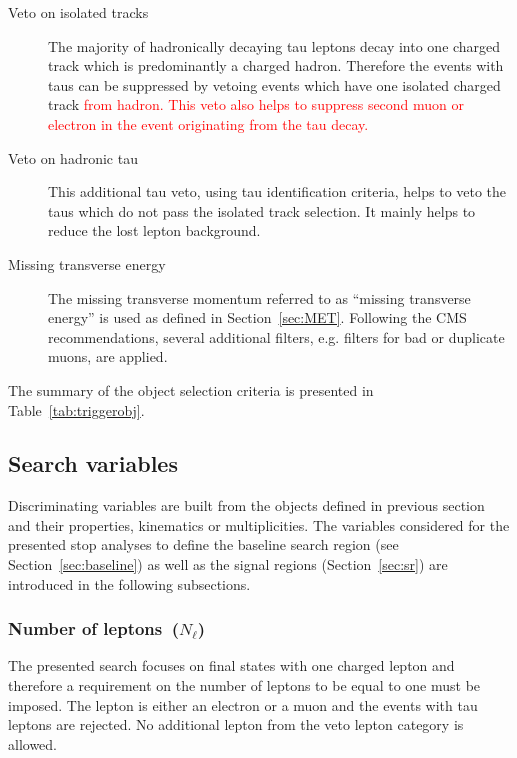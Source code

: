 \begin{description}
\item[Veto on isolated tracks]
The majority of hadronically decaying tau leptons decay into one charged track which is predominantly a charged hadron. Therefore the events with taus can be suppressed by vetoing events which have one isolated charged track \textcolor{red}{from hadron. This veto also helps to suppress second muon or electron in the event originating from the tau decay.}

\item[Veto on hadronic tau]
This additional tau veto, using tau identification criteria, helps to veto the taus which do not pass the isolated track selection. It mainly helps to reduce the lost lepton background.

\item[Missing transverse energy]
The missing transverse momentum referred to as ``missing transverse energy'' is used as defined in Section~\ref{sec:MET}. Following the CMS recommendations, several additional \MET filters, e.g. filters for bad or duplicate muons, are applied.   
\end{description}

The summary of the object selection criteria is presented in Table~\ref{tab:triggerobj}.

\subsection{Search variables~\label{sec:variables}}

Discriminating variables are built from the objects defined in previous section and their properties, kinematics or multiplicities. The variables considered for the presented stop analyses to define the baseline search region (see Section~\ref{sec:baseline}) as well as the signal regions (Section~\ref{sec:sr}) are introduced in the following subsections.

\subsubsection{Number of leptons~($N_{\ell}$)}

The presented search focuses on final states with one charged lepton and therefore a requirement on the number of leptons to be equal to one must be imposed. The lepton is either an electron or a muon and the events with tau leptons are rejected. No additional lepton from the veto lepton category is allowed.

